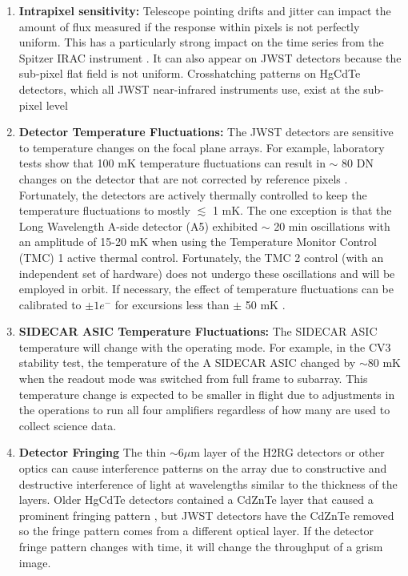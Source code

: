 \documentclass[]{aastex62}
\begin{document}
\begin{enumerate}[resume]
	\item \textbf{Intrapixel sensitivity:} Telescope pointing drifts and jitter can impact the amount of flux measured if the response within pixels is not perfectly uniform.
	This has a particularly strong impact on the time series from the Spitzer IRAC instrument \citep{ingalls2016spitzerRepeatability}.
	It can also appear on JWST detectors because the sub-pixel flat field is not uniform.
	Crosshatching patterns on HgCdTe detectors, which all JWST near-infrared instruments use, exist at the sub-pixel level  \citep{shapiro2018crosshatch,ninan2019crosshatchHPF}
	\item \textbf{Detector Temperature Fluctuations:} The JWST detectors are sensitive to temperature changes on the focal plane arrays. For example, laboratory tests show that 100 mK temperature fluctuations can result in $\sim$ 80 DN changes on the detector that are not corrected by reference pixels \citep{hall2005jwstArrays}. Fortunately, the detectors are actively thermally controlled to keep the temperature fluctuations to mostly $\lesssim$ 1 mK.
The one exception is that the Long Wavelength A-side detector (A5) exhibited $\sim$ 20 min oscillations with an amplitude of 15-20 mK when using the Temperature Monitor Control (TMC) 1 active thermal control.
Fortunately, the TMC 2 control (with an independent set of hardware) does not undergo these oscillations and will be employed in orbit.
If necessary, the effect of temperature fluctuations can be calibrated to $\pm 1 e^-$ for excursions less than $\pm$ 50 mK \citep{hall2005jwstArrays}.
	\item \textbf{SIDECAR ASIC Temperature Fluctuations:} The SIDECAR ASIC temperature will change with the operating mode. For example, in the CV3 stability test, the temperature of the A SIDECAR ASIC changed by $\sim$80 mK when the readout mode was switched from full frame to subarray.
	This temperature change is expected to be smaller in flight due to adjustments in the operations to run all four amplifiers regardless of how many are used to collect science data.
	\item \textbf{Detector Fringing} The thin $\sim 6\mu$m layer of the H2RG detectors or other optics can cause interference patterns on the array due to constructive and destructive interference of light at wavelengths similar to the thickness of the layers. Older HgCdTe detectors contained a CdZnTe layer that caused a prominent fringing pattern \citep{finger2008HgCdTeCharacterization}, but JWST detectors have the CdZnTe removed so the fringe pattern comes from a different optical layer. If the detector fringe pattern changes with time, it will change the throughput of a grism image.

\end{enumerate}
\end{document}
